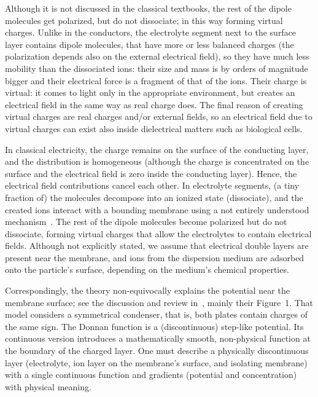 Although it is not discussed in the classical textbooks, the rest of the dipole molecules get polarized, but do not dissociate; in this way forming virtual charges. Unlike in the conductors, the electrolyte segment next to the surface layer contains dipole molecules,
that have more or less balanced charges (the polarization depends also on the external electrical field), so they have much less mobility than the dissociated ions: their size and mass is by orders of magnitude bigger and their electrical force is a fragment of that of the ions. Their charge is virtual: it comes to light only in the appropriate environment, but creates an electrical field in the same way as real charge does. The final reason of creating virtual charges are real charges and/or external fields, so an electrical field due to virtual charges can exist also 
inside dielectrical matters such as biological cells.
\else

\fi


\ifx\magyar\undefined

%
{
In classical electricity, the charge remains on the surface of the conducting layer, and the distribution is homogeneous (although the charge is concentrated on the surface and the electrical field is zero inside the conducting layer). Hence, the electrical field contributions cancel each other.
In electrolyte segments, (a tiny fraction of) the molecules decompose into an ionized state (dissociate), and the created ions interact with a bounding
membrane using a not entirely understood mechanism~\cite{MembraneBindingDipole:2025}. The rest of the dipole molecules become polarized but do not dissociate, forming virtual charges that allow the electrolytes to contain electrical fields. Although not explicitly stated, we assume that electrical double layers are present near the membrane, and ions from the dispersion medium are adsorbed onto the particle's surface, depending on the medium's chemical properties. 

Correspondingly, the theory non-equivocally explains the potential near the membrane surface; see the discussion and review in~\cite{SurfacePotential:1985}, mainly their Figure~1.
That model considers a symmetrical condenser, that is, both plates
contain charges of the same sign.
The Donnan function is a (discontinuous) step-like potential.
Its continuous version introduces a mathematically smooth,  non-physical function at the boundary of the charged layer.
One must describe a physically discontinuous layer (electrolyte, ion layer on the membrane's surface, and isolating membrane) with a single continuous function and gradients (potential and concentration) with physical meaning.
}
\else

